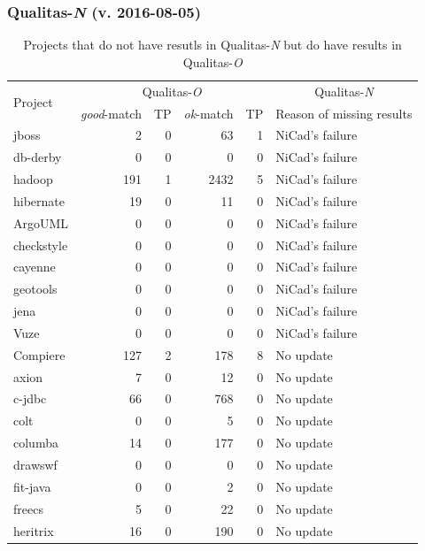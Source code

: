 \documentclass{IEEEtran}
\begin{document}
\subsubsection{Qualitas-\textit{N} (v. 2016-08-05)}

\begin{table}[H]
	\centering
	\caption{Projects that do not have resutls in Qualitas-\textit{N} but do have results in Qualitas-\textit{O}}
	\label{tab:tp_pairs}
	\begin{tabular}{l|r|r|r|r|p{6cm}}
	\hline
	\multirow{2}{*}{Project} & \multicolumn{4}{c|}{Qualitas-\textit{O}} & \multicolumn{1}{c}{Qualitas-\textit{N}} \\ \cline{2-6}
			& \textit{good}-match & TP & \textit{ok}-match & TP & Reason of missing results \\
	\hline
	jboss		& 2 	& 	0	& 63 	& 1 & NiCad's failure \\
	db-derby 	& 0 	&	0	& 0		& 0 & NiCad's failure \\
	hadoop		& 191 	& 1 	& 2432 	& 5 & NiCad's failure \\
	hibernate 	& 19 	& 	0	& 11 	& 0 & NiCad's failure \\
	ArgoUML		& 0		& 	0	& 0		& 0 & NiCad's failure \\
	checkstyle	& 0		&	0	& 0		& 0 & NiCad's failure \\
	cayenne		& 0		& 	0	& 0		& 0 & NiCad's failure \\
	geotools	& 0		& 	0	& 0		& 0 & NiCad's failure \\
	jena		& 0		& 	0	& 0		& 0 & NiCad's failure \\
	Vuze		& 0		&	0	& 0		& 0 & NiCad's failure \\
	Compiere	& 127	& 2		& 178	& 8 & No update \\
	axion		& 7		& 	0	& 12	& 0 & No update \\
	c-jdbc		& 66	&	0	& 768	& 0 & No update \\
	colt		& 0		& 	0	& 5		& 0 & No update \\
	columba		& 14	&	0	& 177	& 0 & No update \\
	drawswf		& 0		&	0	& 0		& 0 & No update \\
	fit-java	& 0		& 0		& 2 	& 0 & No update \\
	freecs		& 5		& 0		& 22	& 0 & No update \\
	heritrix	& 16	& 0		& 190 	& 0 & No update \\

\end{tabular}
\end{table}
\end{document}
